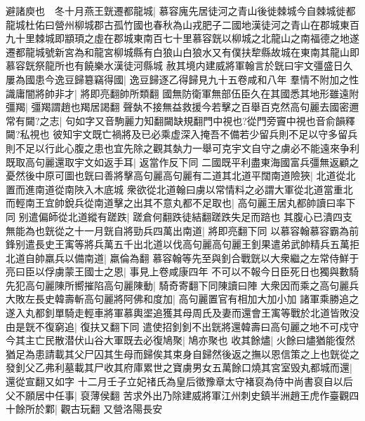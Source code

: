 避諸庾也　冬十月燕王皝遷都龍城|{
	慕容廆先居徒河之青山後徙棘城今自棘城徙都龍城杜佑曰營州柳城郡古孤竹國也春秋為山戎肥子二國地漢徒河之青山在郡城東百九十里棘城即顓頊之虛在郡城東南百七十里慕容皝以柳城之北龍山之南福德之地遂遷都龍城號新宮為和龍宮柳城縣有白狼山白狼水又有僕扶犂縣故城在東南其龍山即慕容皝祭龍所也有饒樂水漢徒河縣城}
赦其境内建威將軍翰言於皝曰宇文彊盛日久屢為國患今逸豆歸簒竊得國|{
	逸豆歸逐乙得歸見九十五卷咸和八年}
羣情不附加之性識庸闇將帥非才|{
	將即亮翻帥所類翻}
國無防衛軍無部伍臣久在其國悉其地形雖遠附彊羯|{
	彊羯謂趙也羯居謁翻}
聲埶不接無益救援今若擊之百舉百克然高句麗去國密邇常有闚?之志|{
	句如字又音駒麗力知翻闚缺規翻門中視也?從門旁竇中視也音俞韻釋闚?私視也}
彼知宇文既亡禍將及已必乘虚深入掩吾不備若少留兵則不足以守多留兵則不足以行此心腹之患也宜先除之觀其埶力一舉可克宇文自守之虜必不能遠來争利既取高句麗還取宇文如返手耳|{
	返當作反下同}
二國既平利盡東海國富兵彊無返顧之憂然後中原可圖也皝曰善將擊高句麗高句麗有二道其北道平闊南道險狹|{
	北道從北置而進南道從南陜入木底城}
衆欲從北道翰曰虜以常情料之必謂大軍從北道當重北而輕南王宜帥銳兵從南道擊之出其不意丸都不足取也|{
	高句麗王居丸都帥讀曰率下同}
别遣偏師從北道縱有蹉跌|{
	蹉倉何翻跌徒結翻蹉跌失足而踣也}
其腹心已潰四支無能為也皝從之十一月皝自將勁兵四萬出南道|{
	將即亮翻下同}
以慕容翰慕容霸為前鋒别遣長史王㝢等將兵萬五千出北道以伐高句麗高句麗王釗果遣弟武帥精兵五萬拒北道自帥羸兵以備南道|{
	羸倫為翻}
慕容翰等先至與釗合戰皝以大衆繼之左常侍鮮于亮曰臣以俘虜蒙王國士之恩|{
	事見上卷咸康四年}
不可以不報今日臣死日也獨與數騎先犯高句麗陳所嚮摧陷高句麗陳動|{
	騎奇寄翻下同陳讀曰陣}
大衆因而乘之高句麗兵大敗左長史韓壽斬高句麗將阿佛和度加|{
	高句麗置官有相加大加小加}
諸軍乘勝追之遂入丸都釗單騎走輕車將軍慕輿埿追獲其母周氏及妻而還會王㝢等戰於北道皆敗没由是皝不復窮追|{
	復扶又翻下同}
遣使招釗釗不出皝將還韓壽曰高句麗之地不可戍守今其主亡民散潜伏山谷大軍既去必復鳩聚|{
	鳩亦聚也}
收其餘燼|{
	火餘曰燼猶能復然}
猶足為患請載其父尸囚其生母而歸俟其束身自歸然後返之撫以恩信策之上也皝從之發釗父乙弗利墓載其尸收其府庫累世之寶虜男女五萬餘口燒其宮室毁丸都城而還|{
	還從宣翻又如字}
十二月壬子立妃禇氏為皇后徵豫章太守褚裒為侍中尚書裒自以后父不願居中任事|{
	裒薄侯翻}
苦求外出乃除建威將軍江州刺史鎮半洲趙王虎作臺觀四十餘所於鄴|{
	觀古玩翻}
又營洛陽長安

